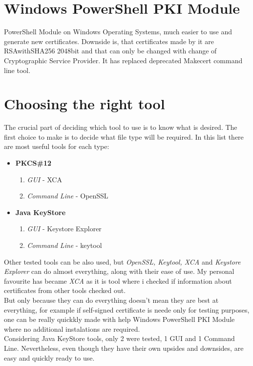 \documentclass[10pt, a4paper]{report}
\begin{document}
\section{Windows PowerShell PKI Module}
PowerShell Module on Windows Operating Systems, much easier to use and generate new certificates. Downside is, that certificates made by it are RSAwithSHA256 2048bit and that can only be changed with change of Cryptographic Service Provider. It has replaced deprecated Makecert command line tool.

\section{Choosing the right tool}
The crucial part of deciding which tool to use is to know what is desired. The first choice to make is to decide what file type will be required.
In this list there are most useful tools for each type:

\begin{itemize}
 \item \textbf{PKCS\#12} \begin{enumerate}\item \textit{GUI} - XCA \item \textit{Command Line} - OpenSSL \end{enumerate}
 \item \textbf{Java KeyStore} \begin{enumerate}\item \textit{GUI} - Keystore Explorer \item \textit{Command Line} - keytool \end{enumerate}
\end{itemize}

Other tested tools can be also used, but \textit{OpenSSL, Keytool, XCA} and \textit{Keystore Explorer} can do almost everything, along with their ease of use. My personal favourite has became \textit{XCA} as it is tool where i checked if information about certificates from other tools checked out.\\

But only because they can do everything doesn't mean they are best at everything, for example if self-signed certificate is neede only for testing purposes, one can be really quickkly made with help Windows PowerShell PKI Module where no additional instalations are required.\\

Considering Java KeyStore tools, only 2 were tested, 1 GUI and 1 Command Line. Nevertheless, even though they have their own upsides and downsides, are easy and quickly ready to use.\\
\end{document}
